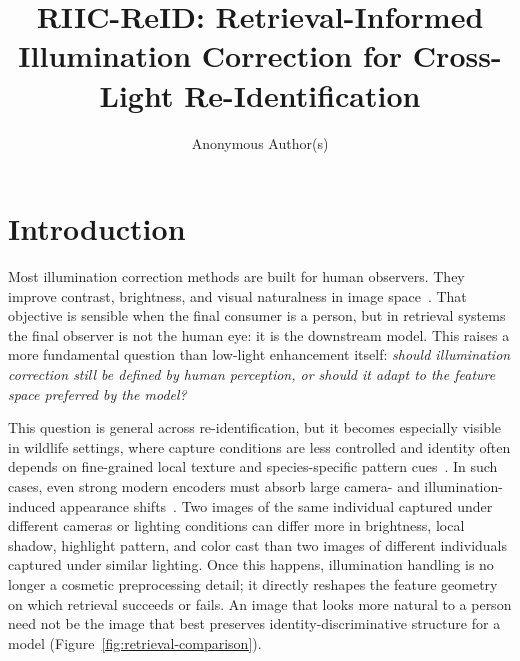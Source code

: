 \documentclass[sigconf,screen,review,anonymous]{acmart}
\title{RIIC-ReID: Retrieval-Informed Illumination Correction for Cross-Light Re-Identification}
\author{Anonymous Author(s)}
\affiliation{%
  \institution{Anonymous Institution}
  \city{Anonymous City}
  \country{Anonymous Country}}
\begin{document}
\maketitle

\section{Introduction}

Most illumination correction methods are built for human observers.
They improve contrast, brightness, and visual naturalness in image
space~\cite{land1971lightness,land1977retinex,wei2018retinexnet,guo2020zerodce,jiang2021enlightengan,wu2022uretinex,ma2022sci,xu2022snraware,cai2023retinexformer,fu2023pairlie,xu2023structureguidance,yi2023diffretinex,yang2023nerco,liu2023msrq,wang2024quadprior,shi2024zeroig,saini2024specularity}.
That objective is sensible when the final consumer is a person, but in
retrieval systems the final observer is not the human eye: it is the
downstream model.
This raises a more fundamental question than low-light enhancement itself:
\emph{should illumination correction still be defined by human perception, or
should it adapt to the feature space preferred by the model?}

This question is general across re-identification, but it becomes especially
visible in wildlife settings, where capture conditions are less controlled and
identity often depends on fine-grained local texture and species-specific
pattern cues~\cite{schneider2019past,schneider2022similarity,cermak2024wildlifedatasets,hou2025openanimals}.
In such cases, even strong modern encoders must absorb large camera- and
illumination-induced appearance shifts~\cite{luo2019bag,zhou2019osnet,he2021transreid,zhou2021osnetain,fu2022pnl,dou2023isr,chen2023solider,zhu2024seas,ni2023partaware,he2024instructreid}.
Two images of the same individual captured under different cameras or lighting
conditions can differ more in brightness, local shadow, highlight pattern, and
color cast than two images of different individuals captured under similar
lighting.
Once this happens, illumination handling is no longer a cosmetic preprocessing
detail; it directly reshapes the feature geometry on which retrieval succeeds
or fails.
An image that looks more natural to a person need not be the image that best
preserves identity-discriminative structure for a model
(Figure~\ref{fig:retrieval-comparison}).
\end{document}
